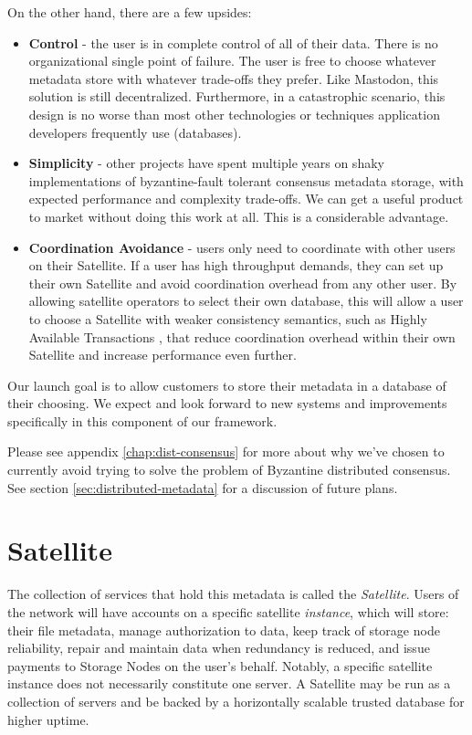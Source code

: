 \documentclass[8pt,fleqn,openany]{book}
\begin{document}
On the other hand, there are a few upsides:
\begin{itemize}
\item {\bf Control} - the user is in complete control of all of their data.
  There is no organizational single point of failure. The user is free
  to choose whatever metadata store with whatever trade-offs they prefer. Like
  Mastodon\cite{mastodon}, this solution is still decentralized. Furthermore, in a
  catastrophic scenario, this design is no worse than most other technologies or
  techniques application developers frequently use (databases).
\item {\bf Simplicity} - other projects have spent multiple years on shaky
  implementations of byzantine-fault tolerant consensus metadata storage,
  with expected performance and complexity trade-offs.
  We can get a useful product to market without doing this work at all.
  This is a considerable advantage.
\item {\bf Coordination Avoidance} - users only need to coordinate with
  other users on their Satellite. If a user has high throughput demands,
  they can set up their own Satellite and avoid coordination overhead from
  any other user. By allowing satellite operators to select their own database,
  this will allow a user to choose a Satellite with weaker consistency
  semantics, such as Highly Available Transactions \cite{hat}, that reduce
  coordination overhead within their own Satellite and increase performance
  even further.
\end{itemize}

Our launch goal is to allow customers to store their metadata in a database of
their choosing. We expect and look forward to new systems and improvements
specifically in this component of our framework.

Please see appendix \ref{chap:dist-consensus} for more about why we've chosen
to currently avoid trying to solve the problem of Byzantine distributed consensus.
See section \ref{sec:distributed-metadata} for a discussion of future plans.

\section{Satellite}

The collection of services that hold this metadata is called the
{\em Satellite}. Users of the network will have accounts on a specific
satellite {\em instance}, which will store: their file metadata, manage authorization
to data, keep track of storage node reliability, repair and maintain data when
redundancy is reduced, and issue payments to Storage Nodes on the user's behalf.
Notably, a specific satellite instance does not necessarily constitute one
server. A Satellite may be run as a collection of servers and be backed by
a horizontally scalable trusted database for higher uptime.
\end{document}
